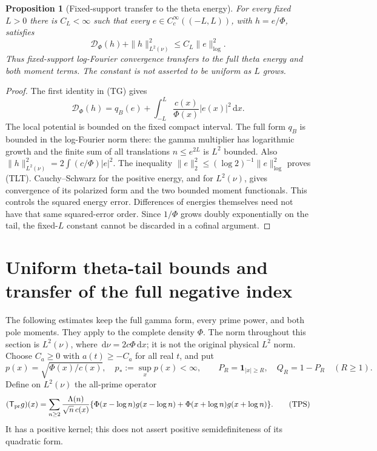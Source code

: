 \documentclass[11pt]{article}
\newtheorem{proposition}[theorem]{Proposition}
\theoremstyle{remark}\newtheorem{remark}[theorem]{Remark}
\newcommand{\dd}{\,\mathrm d}
\begin{document}
\begin{proposition}[Fixed-support transfer to the theta energy]
\label{prop:theta-log-transfer}
For every fixed $L>0$ there is $C_L<\infty$ such that
every $e\in C_c^\infty((-L,L))$, with $h=e/\Phi$, satisfies
\[
 \mathcal D_\Phi(h)+\|h\|_{L^2(\nu)}^2
                         \le C_L\|e\|_{\log}^2.            \tag{TLT}
\]
Thus fixed-support log-Fourier convergence transfers to the
full theta energy and both moment terms. The constant is not
asserted to be uniform as $L$ grows.
\end{proposition}
\begin{proof}
The first identity in (TG) gives
\[
 \mathcal D_\Phi(h)
       =q_B(e)+\int_{-L}^L\frac{c(x)}{\Phi(x)}|e(x)|^2\dd x.
\]
The local potential is bounded on the fixed compact interval.
The full form $q_B$ is bounded in the log-Fourier norm there:
the gamma multiplier has logarithmic growth and the finite
sum of all translations $n\le e^{2L}$ is $L^2$ bounded.
Also
$\|h\|_{L^2(\nu)}^2=2\int(c/\Phi)|e|^2$.
The inequality $\|e\|_2^2\le(\log2)^{-1}\|e\|_{\log}^2$
proves (TLT). Cauchy--Schwarz for the positive energy, and for
$L^2(\nu)$, gives convergence of its polarized form and the
two bounded moment functionals.
This controls the squared energy error. Differences of energies
themselves need not have that same squared-error order.
Since $1/\Phi$ grows doubly exponentially on the tail, the
fixed-$L$ constant cannot be discarded in a cofinal argument.
\end{proof}

\section{Uniform theta-tail bounds and transfer of the full negative index}
The following estimates keep the full gamma form, every prime power,
and both pole moments. They apply to the complete density $\Phi$.
The norm throughout this section is $L^2(\nu)$, where
$\dd\nu=2c\Phi\dd x$; it is not the original physical $L^2$ norm.
Choose $C_a\ge0$ with $a(t)\ge-C_a$ for all real $t$, and put
\[
 p(x)=\sqrt{\Phi(x)/c(x)},\quad p_*:=\sup_xp(x)<\infty,\qquad
 P_R=\mathbf1_{|x|\ge R},\quad Q_R=1-P_R\quad(R\ge1).
\]
Define on $L^2(\nu)$ the all-prime operator
\[
 (\mathsf T_{\rm pr}g)(x)=
 \sum_{n\ge2}\frac{\Lambda(n)}{\sqrt n\,c(x)}
 \{\Phi(x-\log n)g(x-\log n)
                  +\Phi(x+\log n)g(x+\log n)\}.             \tag{TPS}
\]
It has a positive kernel; this does not assert positive
semidefiniteness of its quadratic form.
\end{document}
